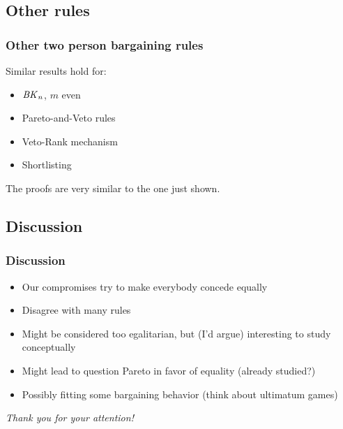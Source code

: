 \documentclass[french, english]{beamer}
\begin{document}
\subsection{Other rules}
\begin{frame}
	\frametitle{Other two person bargaining rules}
	Similar results hold for: 
	\begin{itemize}
		\item $\BK[n]$, $m$ even
		\item Pareto-and-Veto rules \citep{Laslier2020}
		\item Veto-Rank mechanism \citep{Clippel2014}
		\item Shortlisting \citep{Clippel2014}
	\end{itemize}
	The proofs are very similar to the one just shown.
\end{frame}

\subsection{Discussion}
\begin{frame}
	\frametitle{Discussion}
	\begin{itemize}
		\item Our compromises try to make everybody concede equally
		\item Disagree with many rules
		\item Might be considered too egalitarian, but (I’d argue) interesting to study conceptually
		\item Might lead to question Pareto in favor of equality (already studied?)
		\item Possibly fitting some bargaining behavior (think about ultimatum games)
	\end{itemize}
\end{frame}

\begin{frame}[plain]
	\addtocounter{framenumber}{-1}
	\begin{center}
		\huge
		\textit{Thank you for your attention!}
	\end{center}
\end{frame}

\appendix
\AtBeginSection{
}
\end{document}
